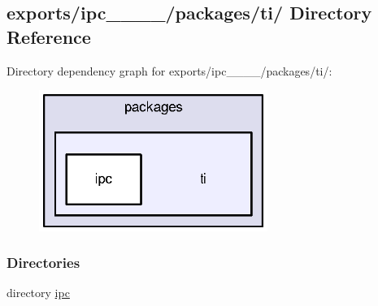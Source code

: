 \subsection{exports/ipc\-\_\-\_\-\_\-\_/packages/ti/ Directory Reference}
\label{dir_3874edc6fe89abc7699a4e90a506e9bd}
Directory dependency graph for exports/ipc\-\_\-\_\-\_\-\_/packages/ti/\-:
\nopagebreak
\begin{figure}[H]
\begin{center}
\leavevmode
\includegraphics[width=211pt]{dir_3874edc6fe89abc7699a4e90a506e9bd_dep}
\end{center}
\end{figure}
\subsubsection*{Directories}
\begin{DoxyCompactItemize}
\item 
directory \hyperlink{dir_483c661eba1a09e3ba6089a7e4388180}{ipc}
\end{DoxyCompactItemize}
